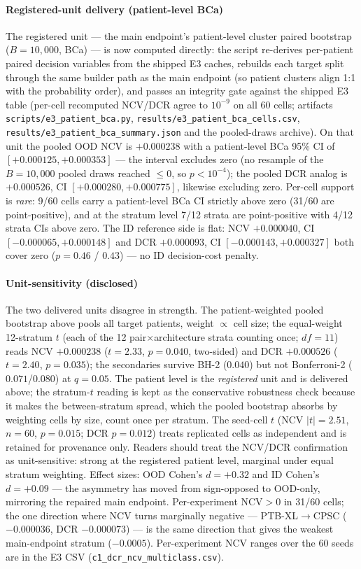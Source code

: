 \documentclass[review,12pt,nonatbib]{elsarticle}
\begin{document}
\paragraph{Registered-unit delivery (patient-level BCa)} The
registered unit --- the main endpoint's patient-level cluster paired
bootstrap ($B=10{,}000$, BCa) --- is now computed directly: the script
re-derives per-patient paired decision variables from the shipped E3
caches, rebuilds each target split through the same builder path as the
main endpoint (so patient clusters align 1:1 with the probability
order), and passes an integrity gate against the shipped E3 table
(per-cell recomputed NCV/DCR agree to $10^{-9}$ on all 60 cells;
artifacts \texttt{scripts/e3\_patient\_bca.py},
\texttt{results/e3\_patient\_bca\_cells.csv},
\texttt{results/e3\_patient\_bca\_summary.json} and the pooled-draws
archive). On that unit the pooled OOD NCV is $+0.000238$ with a
patient-level BCa 95\% CI of $[+0.000125, +0.000353]$ --- the interval
excludes zero (no resample of the $B=10{,}000$ pooled draws reached
$\le 0$, so $p < 10^{-4}$); the pooled DCR analog is $+0.000526$, CI
$[+0.000280, +0.000775]$, likewise excluding zero. Per-cell support is
\emph{rare}: 9/60 cells carry a patient-level BCa CI strictly above
zero (31/60 are point-positive), and at the stratum level 7/12 strata
are point-positive with 4/12 strata CIs above zero. The ID reference
side is flat: NCV $+0.000040$, CI $[-0.000065, +0.000148]$ and DCR
$+0.000093$, CI $[-0.000143, +0.000327]$ both cover zero ($p = 0.46$ /
$0.43$) --- no ID decision-cost penalty.

\paragraph{Unit-sensitivity (disclosed)} The two delivered units
disagree in strength. The patient-weighted pooled bootstrap above
pools all target patients, weight $\propto$ cell size; the
equal-weight 12-stratum $t$ (each of the 12 pair$\times$architecture
strata counting once; $df=11$) reads NCV $+0.000238$ ($t=2.33$,
$p=0.040$, two-sided) and DCR $+0.000526$ ($t=2.40$, $p=0.035$);
the secondaries survive BH-2 ($0.040$) but not Bonferroni-2
($0.071$/$0.080$) at $q=0.05$. The patient
level is the \emph{registered} unit and is delivered above; the
stratum-$t$ reading is kept as the conservative robustness check
because it makes the between-stratum spread, which the pooled
bootstrap absorbs by weighting cells by size, count once per stratum.
The seed-cell $t$ (NCV $|t|=2.51$, $n=60$, $p=0.015$; DCR $p=0.012$)
treats replicated cells as independent and is retained for provenance
only. Readers should treat the NCV/DCR confirmation as unit-sensitive:
strong at the registered patient level, marginal under equal stratum
weighting. Effect sizes: OOD Cohen's $d = +0.32$ and ID Cohen's
$d = +0.09$ --- the asymmetry has moved from sign-opposed to OOD-only,
mirroring the repaired main endpoint. Per-experiment NCV$>0$ in 31/60
cells; the one direction where NCV turns marginally negative ---
PTB-XL$\rightarrow$CPSC ($-0.000036$, DCR $-0.000073$) --- is the same
direction that gives the weakest main-endpoint stratum ($-0.0005$).
Per-experiment NCV ranges over the 60 seeds are in the E3 CSV
(\texttt{c1\_dcr\_ncv\_multiclass.csv}).
\end{document}
